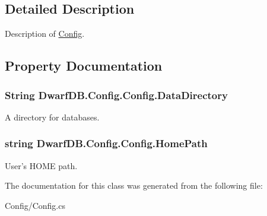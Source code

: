 \subsection{Detailed Description}
Description of \hyperlink{class_dwarf_d_b_1_1_config_1_1_config}{Config}. 

\subsection{Property Documentation}
\hypertarget{class_dwarf_d_b_1_1_config_1_1_config_afcb080c4360c0c344d2b9d9ecb72c297}{
\subsubsection[{DataDirectory}]{\setlength{\rightskip}{0pt plus 5cm}String DwarfDB.Config.Config.DataDirectory}}
\label{class_dwarf_d_b_1_1_config_1_1_config_afcb080c4360c0c344d2b9d9ecb72c297}


A directory for databases. 

\hypertarget{class_dwarf_d_b_1_1_config_1_1_config_a390a89963606ed0009489bfe8b46160d}{
\subsubsection[{HomePath}]{\setlength{\rightskip}{0pt plus 5cm}string DwarfDB.Config.Config.HomePath}}
\label{class_dwarf_d_b_1_1_config_1_1_config_a390a89963606ed0009489bfe8b46160d}


User's HOME path. 



The documentation for this class was generated from the following file:\begin{DoxyCompactItemize}
\item 
Config/Config.cs\end{DoxyCompactItemize}
